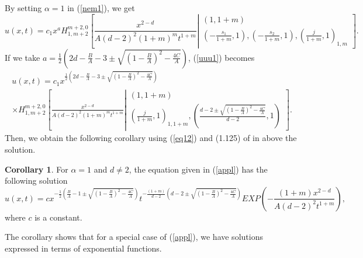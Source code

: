 \documentclass[12pt]{article}
\theoremstyle{definition}
\newtheorem{corollary}{Corollary}
\begin{document}
By setting $\alpha=1$ in (\ref{nem1}), we get
\begin{equation}
    \label{uuu1}
    u(x,t)=c_1x^aH_{1,m+2}^{m+2,0} \left[ \frac{x^{2-d}}{A(d-2)^2(1+m)^{m}t^{1+m}} \left| \begin{matrix}
( 1 , 1+m )  \\
\left( -\frac{s_1}{1+m} , 1 \right) ,\left( -\frac{s_2}{1+m} , 1 \right) , \left(\frac{j}{1+m} , 1  \right)_{1,m}   \end{matrix}\right.\right].
    \end{equation}
If we take $a=\frac{1}{2}\left(2d-\frac{B}{A}-3\pm\sqrt{\left(1-\frac{B}{A}\right)^2-\frac{4C}{A}}\right)$, (\ref{uuu1}) becomes 
\begin{multline*}
       u(x,t)=c_1x^{\frac{1}{2}\left(2d-\frac{B}{A}-3\pm\sqrt{\left(1-\frac{B}{A}\right)^2-\frac{4C}{A}
}\right)}\\
\times H_{1,m+2}^{m+2,0} \left[ \frac{x^{2-d}}{A(d-2)^2(1+m)^{m}t^{1+m}} \left| \begin{matrix}
( 1 , 1+m )  \\
\left(\frac{j}{1+m} , 1  \right)_{1,1+m},\left( \frac{d-2\pm\sqrt{\left(1-\frac{B}{A}\right)^2-\frac{4C}{A}
}}{d-2} , 1 \right)  \end{matrix}\right.\right].
    \end{multline*}
Then, we obtain the following corollary using (\ref{eq12}) and (1.125) of \cite{Hnom2} in above the solution.
\begin{corollary}
For $\alpha=1$ and $d\neq 2$, the equation given in (\ref{appl}) has the following solution
$$u(x,t)=cx^{-\frac{1}{2}\left(\frac{B}{A}-1\pm\sqrt{\left(1-\frac{B}{A}\right)^2-\frac{4C}{A}}\right)}t^{-\frac{(1+m)}{d-2}\left(d-2\pm\sqrt{ 
   \left(1-\frac{B}{A}\right)^2-\frac{4C}{A}           }\right)}EXP\left(-\frac{(1+m)x^{2-d}}{A(d-2)^2t^{1+m}}\right),$$
where $c$ is a constant.
\end{corollary}
The corollary shows that for a special case of (\ref{appl}), we have solutions expressed in terms of exponential functions.
\end{document}
